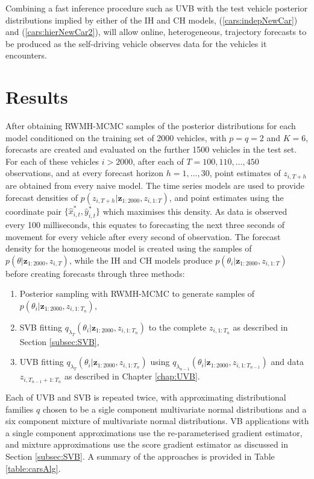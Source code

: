 \documentclass[
12pt, %
onehalfspacing, %
nohyperref, %
headsepline, %
chapterinoneline, %
]{MastersDoctoralThesis} %
\begin{document}
Combining a fast inference procedure such as UVB with the test vehicle posterior distributions implied by either of the IH and CH models, (\ref{cars:indepNewCar}) and (\ref{cars:hierNewCar2}), will allow online, heterogeneous, trajectory forecasts to be produced as the self-driving vehicle observes data for the vehicles it encounters.

\section{Results}
\label{sec:carsResults}

After obtaining RWMH-MCMC samples of the posterior distributions for each model conditioned on the training set of 2000 vehicles, with $p = q = 2$ and $K = 6$, forecasts are created and evaluated on the further 1500 vehicles in the test set. For each of these vehicles $i > 2000$, after each of $T = 100, 110, \ldots, 450$ observations, and at every forecast horizon $h = 1, \ldots, 30$, point estimates of $z_{i, T+h}$ are obtained from every naive model. The time series models are used to provide forecast densities of $p(z_{i, T+h} | \textbf{z}_{1:2000}, z_{i, 1:T})$, and point estimates using the coordinate pair $\{\hat{x}_{i, t}^*, \hat{y}_{i, t}^*\}$ which maximises this density. As data is observed every 100 milliseconds, this equates to forecasting the next three seconds of movement for every vehicle after every second of observation. The forecast density for the homogeneous model is created using the samples of $p(\theta | \textbf{z}_{1:2000}, z_{i, T})$, while the IH and CH models produce $p(\theta_{i} | \textbf{z}_{1:2000}, z_{i, 1:T})$ before creating forecasts through three methods:
\begin{enumerate}
\item Posterior sampling with RWMH-MCMC to generate samples of $p(\theta_i | \textbf{z}_{1:2000}, z_{i, 1:T_n})$,
\item SVB fitting $q_{\lambda_T}(\theta_{i} | \textbf{z}_{1:2000}, z_{i, 1:T_n})$ to the complete $z_{i, 1:T_n}$ as described in Section \ref{subsec:SVB},
\item UVB fitting $q_{\lambda_T}(\theta_{i} | \textbf{z}_{1:2000}, z_{i, 1:T_n})$ using $q_{\lambda_{n-1}}(\theta_{i} | \textbf{z}_{1:2000}, z_{i, 1:T_{n-1}})$ and data $z_{i, T_{n-1}+1:T_{n}}$ as described in Chapter \ref{chap:UVB}.
\end{enumerate}

Each of UVB and SVB is repeated twice, with approximating distributional families $q$ chosen to be a sigle component multivariate normal distributions and a six component mixture of multivariate normal distributions. VB applications with a single component approximations use the re-parameterised gradient estimator, and mixture approximations use the score gradient estimator as discussed in Section \ref{subsec:SVB}. A summary of the approaches is provided in Table \ref{table:carsAlg}. 
\\
\end{document}
